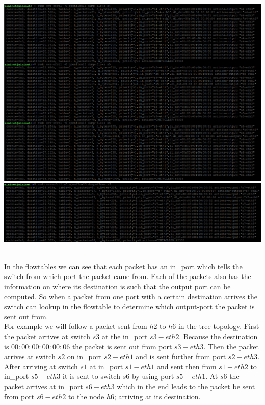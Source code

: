 \documentclass{article}
\begin{document}
\begin{adjustwidth}{2em}{2em}
\begin{enumerate}
			\includegraphics[scale=0.42]{tree_flowtables_3.png} \\
			\includegraphics[scale=0.42]{tree_flowtables_4.png}
		\end{enumerate}
		\hfill \\
		In the flowtables we can see that each packet has an in\_port which tells the switch from which port the packet came from. Each of the packets also has the information on where its destination is such that the output port can be computed. So when a packet from one port with a certain destination arrives the switch can lookup in the flowtable to determine which output-port the packet is sent out from. \\
		For example we will follow a packet sent from $h2$ to $h6$ in the tree topology. First the packet arrives at switch $s3$ at the in\_port $s3-eth2$. Because the destination is $00:00:00:00:00:06$ the packet is sent out from port $s3-eth3$. Then the packet arrives at switch $s2$ on in\_port $s2-eth1$ and is sent further from port $s2-eth3$. After arriving at switch $s1$ at in\_port $s1-eth1$ and sent then from $s1-eth2$ to in\_port $s5-eth3$ it is sent to switch $s6$ by using port $s5-eth1$. At $s6$ the packet arrives at in\_port $s6-eth3$ which in the end leads to the packet be sent from port $s6-eth2$ to the node $h6$; arriving at its destination.
	\end{adjustwidth}	
\end{document}
